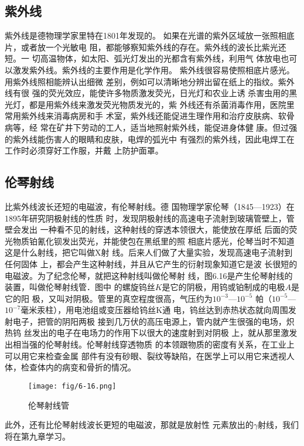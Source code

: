 \subsection{紫外线}

紫外线是德物理学家里特在1801年发现的。
如果在光谱的紫外区域放一张照相底片，或者放一个光敏电
阻，都能够察知紫外线的存在。紫外线的波长比紫光还短。一
切高温物体，如太阳、弧光灯发出的光都含有紫外线，利用气
体放电也可以激发紫外线。紫外线的主要作用是化学作用。
紫外线很容易使照相底片感光。用紫外线照相能辨认出细微
差别，例如可以清晰地分辨出留在纸上的指纹。紫外线有很
强的荧光效应，能使许多物质激发荧光，日光灯和农业上诱
杀害虫用的黑光灯，都是用紫外线来激发荧光物质发光的，紫
外线还有杀菌消毒作用，医院里常用紫外线来消毒病房和手
术室，紫外线还能促进生理作用和治疗皮肤病、软骨病等，经
常在矿井下劳动的工人，适当地照射紫外线，能促进身体健
康。但过强的紫外线能伤害人的眼睛和皮肤，电焊的弧光中
有强烈的紫外线，因此电焊工在工作时必须穿好工作服，并戴
上防护面罩。

\subsection{伦琴射线}
比紫外线波长还短的电磁波，有伦琴射线。德
国物理学家伦琴（1845—1923）在1895年研究阴极射线的性质
时，发现阴极射线的高速电子流射到玻璃管壁上，管壁会发出
一种看不见的射线，这种射线的穿透本领很大，能使放在厚纸
后面的荧光物质铂氰化钡发出荧光，并能使包在黑纸里的照
相底片感光，伦琴当时不知道这是什么射线，把它叫做X射
线。后来人们做了大量实验，发现高速电子流射到任何固体
上，都会产生这种射线，并且从它产生的衍射现象知道它是波
长很短的电磁波。为了纪念伦琴，就把这种射线叫做伦琴射
线，图6.16是产生伦琴射线的装置，叫做伦琴射线管．图中
的螺旋钨丝$K$是它的阴极，用钨或铂制成的电极$A$是它的阳
极，又叫对阴极。管里的真空程度很高，气压约为$10^{-3}$—$10^{-5}$
帕（$10^{-5}$—$10^{-7}$毫米汞柱），用电池组或变压器给钨丝K通
电，钨丝达到赤热状态就向周围发射电子，把管的阴阳两极
接到几万伏的高压电源上，管内就产生很强的电场，炽热钨
丝发出的电子在电场力的作用下以很大的速度射到对阴极
上，就从那里激发出相当强的伦琴射线。伦琴射线穿透物质
的本领跟物质的密度有关系，在工业上可以用它来检查金属
部件有没有砂眼、裂纹等缺陷，在医学上可以用它来透视人
体，检查体内的病变和骨折的情况。
\begin{figure}[htp]\centering
    \texttt{[image: fig/6-16.png]}
    \caption{伦琴射线管}
    \end{figure}

此外，还有比伦琴射线波长更短的电磁波，那就是放射性
元素放出的$\gamma$射线，我们将在第九章学习。

